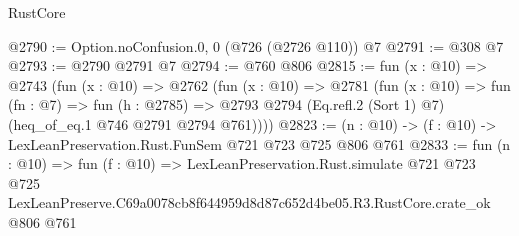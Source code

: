 \begin{lexlean}{RustCore}
\begin{coremodule}
@2790 := Option.noConfusion.{0, 0} (@726 (@2726 @110)) @7
@2791 := @308 @7
@2793 := @2790 @2791 @7
@2794 := @760 @806
@2815 := fun (x : @10) =>
  @2743
    (fun (x : @10) =>
    @2762
      (fun (x : @10) =>
      @2781
        (fun (x : @10) =>
        fun (fn : @7) =>
        fun (h : @2785) =>
        @2793 @2794 (Eq.refl.{2} (Sort 1) @7) (heq_of_eq.{1} @746 @2791 @2794 @761))))
@2823 := (n : @10) -> (f : @10) -> LexLeanPreservation.Rust.FunSem @721 @723 @725 @806 @761
@2833 := fun (n : @10) =>
  fun (f : @10) =>
  LexLeanPreservation.Rust.simulate
    @721
    @723
    @725
    LexLeanPreserve.C69a0078cb8f644959d8d87c652d4be05.R3.RustCore.crate_ok
    @806
    @761
\end{coremodule}
\end{lexlean}
